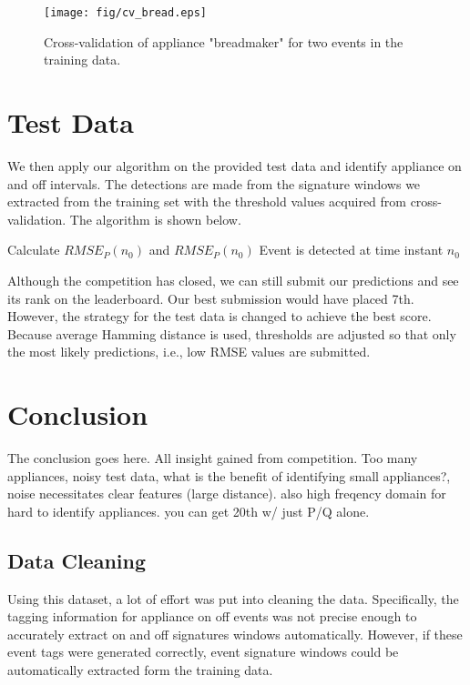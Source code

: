 \documentclass[conference]{IEEEtran}
\begin{document}
\begin{figure}[!t]
	\centering
	\texttt{[image: fig/cv\_bread.eps]}
	\caption{Cross-validation of appliance "breadmaker" for two events in the training data.}
	\label{fig:bread}
\end{figure}


\section{Test Data}\label{sec:test}
We then apply our algorithm on the provided test data and identify appliance on and off intervals.  The detections are made from the signature windows we extracted from the training set with the threshold values acquired from cross-validation.  The algorithm is shown below.
\begin{algorithmic}
	\STATE Calculate $RMSE_P(n_0)$ and $RMSE_P(n_0)$
	\STATE Event is detected at time instant $n_0$
	\ENDIF
	\ENDFOR
\end{algorithmic}
Although the competition has closed, we can still submit our predictions and see its rank on the leaderboard. Our best submission would have placed 7th.  However, the strategy for the test data is changed to achieve the best score.  Because average Hamming distance is used, thresholds are adjusted so that only the most likely predictions, i.e., low RMSE values are submitted.  


\section{Conclusion}\label{sec:concl}
The conclusion goes here. All insight gained from competition. Too many appliances, noisy test data, what is the benefit of identifying small appliances?, noise necessitates clear features (large distance).  also high freqency domain for hard to identify appliances.  you can get 20th w/ just P/Q alone.   

\subsection{Data Cleaning}
Using this dataset, a lot of effort was put into cleaning the data.  Specifically, the tagging information for appliance on off events was not precise enough to accurately extract on and off signatures windows automatically.  However, if these event tags were generated correctly, event signature windows could be automatically extracted form the training data. 
\end{document}
